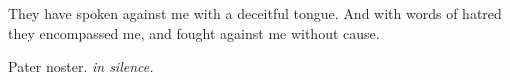 ﻿%
\bigskip\bigskip
\def\matinsnocturn{3rd Nocturn}
%
\large
{
\def\preant{\setgrefactor{17}\large}
\def\prepsalm{\greblockcustos}
\def\anttranslation{From them that rise up against me deliver me, O Lord: for they have seized my soul.}
\def\psalmtranslationsmall{T}
\def\lalinebreakaftereighteen{T}
\def\enlinebreakaftereighteen{T}
\let\prepsalm=\undefined
}
%
\printseparation
{
\def\preant{\setgrefactor{17}\large}
\def\prepsalm{\normalsize}
\def\psalmtranslationsmall{T}
\def\anttranslation{Thou hast put away mine acquaintance far from me; I was delivered up, and came not forth.}
\def\enlinebreakaftertwelve{T}
\let\prepsalm=\undefined
}
%
\printseparation{}
\def\preant{\setgrefactor{17}\large}
\def\psalmtranslationsmall{T}
\def\anttranslation{They shall conspire against the soul of the just, and condemn the innocent blood.}

\bigskip\bigskip
{}
{They have spoken against me with a deceitful tongue.}
{And with words of hatred they encompassed me, and fought against me without cause.}

\bigskip
Pater noster. \emph{in silence.}


